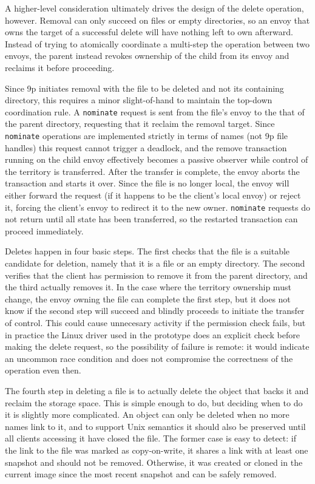 A higher-level consideration ultimately drives the design of the delete operation, however. Removal can only succeed on files or empty directories, so an envoy that owns the target of a successful delete will have nothing left to own afterward. Instead of trying to atomically coordinate a multi-step the operation between two envoys, the parent instead revokes ownership of the child from its envoy and reclaims it before proceeding.

Since 9p initiates removal with the file to be deleted and not its containing directory, this requires a minor slight-of-hand to maintain the top-down coordination rule. A \texttt{nominate} request is sent from the file's envoy to the that of the parent directory, requesting that it reclaim the removal target. Since \texttt{nominate} operations are implemented strictly in terms of names (not 9p file handles) this request cannot trigger a deadlock, and the remove transaction running on the child envoy effectively becomes a passive observer while control of the territory is transferred. After the transfer is complete, the envoy aborts the transaction and starts it over. Since the file is no longer local, the envoy will either forward the request (if it happens to be the client's local envoy) or reject it, forcing the client's envoy to redirect it to the new owner. \texttt{nominate} requests do not return until all state has been transferred, so the restarted transaction can proceed immediately.

Deletes happen in four basic steps. The first checks that the file is a suitable candidate for deletion, namely that it is a file or an empty directory. The second verifies that the client has permission to remove it from the parent directory, and the third actually removes it. In the case where the territory ownership must change, the envoy owning the file can complete the first step, but it does not know if the second step will succeed and blindly proceeds to initiate the transfer of control. This could cause unnecesary activity if the permission check fails, but in practice the Linux driver used in the prototype does an explicit check before making the delete request, so the possibility of failure is remote: it would indicate an uncommon race condition and does not compromise the correctness of the operation even then.

The fourth step in deleting a file is to actually delete the object that backs it and reclaim the storage space. This is simple enough to do, but deciding when to do it is slightly more complicated. An object can only be deleted when no more names link to it, and to support Unix semantics it should also be preserved until all clients accessing it have closed the file. The former case is easy to detect: if the link to the file was marked as copy-on-write, it shares a link with at least one snapshot and should not be removed. Otherwise, it was created or cloned in the current image since the most recent snapshot and can be safely removed.

